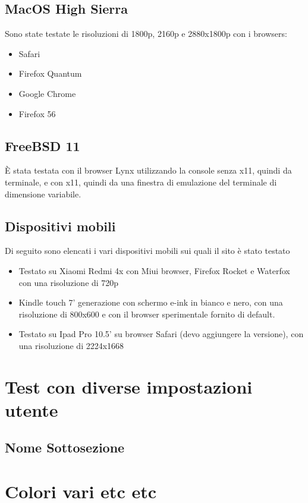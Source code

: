 \documentclass[openany, a4paper, 12pt]{report}
\begin{document}
				\subsection{MacOS High Sierra}
				Sono state testate le risoluzioni di 1800p, 2160p e 2880x1800p con i browsers:
				\begin{itemize}
					\item Safari
					\item Firefox Quantum
					\item Google Chrome
					\item Firefox 56
				\end{itemize}

				\subsection{FreeBSD 11}
				\`{E} stata testata con il browser Lynx utilizzando la console senza x11, quindi da terminale, e con x11, quindi da una finestra di emulazione del terminale di dimensione variabile.

				\subsection{Dispositivi mobili}
				Di seguito sono elencati i vari dispositivi mobili sui quali il sito è stato testato
				\begin{itemize}
				\item Testato su Xiaomi Redmi 4x con Miui browser, Firefox Rocket e Waterfox con una risoluzione di 720p
				\item Kindle touch 7' generazione con schermo e-ink in bianco e nero, con una risoluzione di 800x600 e con il browser sperimentale fornito di default.
        		\item Testato su Ipad Pro 10.5' su browser Safari (devo aggiungere la versione), con una risoluzione di 2224x1668
				\end{itemize}
		\section{Test con diverse impostazioni utente}
			\subsection{Nome Sottosezione}
		\section{Colori vari etc etc}
\end{document}
